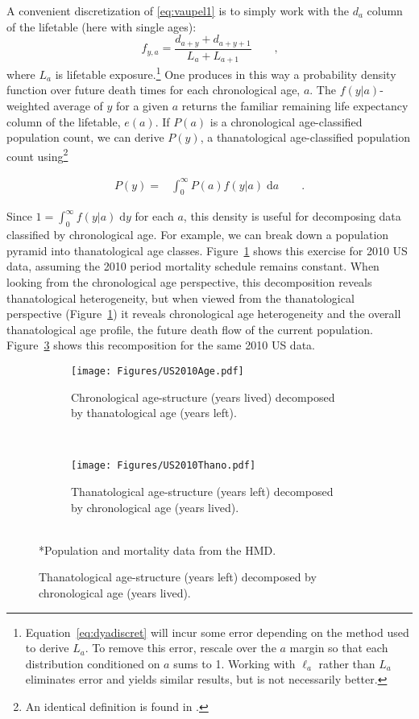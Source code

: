 \documentclass{article}
\newcommand{\dd}{\; \mathrm{d}}
\newcommand{\ec}{\quad\quad\text{,}}
\newcommand{\ep}{\quad\quad\text{.}}
\begin{document}
A convenient discretization of \eqref{eq:vaupel1} is to simply work with the
$d_a$ column of the lifetable (here with single ages):
\begin{equation}
\label{eq:dyadiscret}
f_{y, a} =  \frac{d_{a+y}+d_{a+y+1}}{L_a + L_{a+1}} \ec
\end{equation}
where $L_a$ is lifetable exposure.\footnote{Equation~\eqref{eq:dyadiscret}
will incur some error depending on the method used to derive $L_a$. To remove
this error, rescale over the $a$ margin so that each distribution conditioned on
$a$ sums to 1. Working with $\ell_a$ rather than $L_a$ eliminates error and
yields similar results, but is not necessarily better.} One produces in this way a probability density function over future death times for each chronological age,
$a$. The $f(y|a)$- weighted average of $y$ for a given $a$ returns the familiar
remaining life expectancy column of the lifetable, $e(a)$. If $P(a)$ is a
chronological age-classified population count, we can derive $P(y)$, a
thanatological age-classified population count using\footnote{An identical
definition is found in \citet{brouard1989mouvements}.}

\begin{align}
\label{eq:transform}
P(y) =& \int_0^\infty P(a) f(y | a) \dd a \ep
\end{align}

Since $1 = \int_0^\infty f(y|a) \dd y$ for each $a$,
this density is useful for decomposing data classified by chronological age. For
example, we can break down a population pyramid into thanatological age classes.
Figure~\ref{fig:USdecomp} shows this exercise for 2010 US data, assuming the
2010 period mortality schedule remains constant. When looking from the
chronological age perspective, this decomposition reveals thanatological
heterogeneity, but when viewed from the thanatological perspective
(Figure~\ref{fig:USdecomp}) it reveals chronological age heterogeneity and the
overall thanatological age profile, the future death flow of the current
population.
Figure~\ref{fig:USrecomp} shows this recomposition for the same 2010
US data.

\begin{figure}[ht!]
	\caption{2010 US population structure}
	\begin{center}
	\begin{subfigure}{.45\textwidth}
		\caption{Chronological age-structure (years lived) decomposed by
		thanatological age (years left).}
		\label{fig:USdecomp}
		\texttt{[image: Figures/US2010Age.pdf]}
	\end{subfigure}
	~
	\begin{subfigure}{.45\textwidth}
		\caption{Thanatological age-structure (years left) decomposed by chronological
		age (years lived).}
		\label{fig:USrecomp}
		\texttt{[image: Figures/US2010Thano.pdf]}
	\end{subfigure}
	\\
	\small{*Population and mortality data from the HMD.}
	\end{center}
\end{figure}
\end{document}
